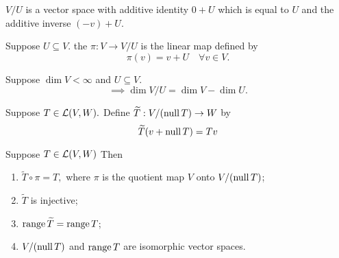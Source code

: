 \begin{thm} 
  $V/U$ is a vector space with additive identity $0+U$ which is equal to $U$ and the additive inverse $(-v)+U$.
\end{thm}

\begin{mydef} 
  Suppose $U \subseteq V$. the  $\pi: V \to V/U$ is the linear map defined by
  \begin{equation}
    \pi(v)=v+U \quad \forall v \in V.
  \end{equation}
\end{mydef}

\begin{thm}
  Suppose $\dim V < \infty$ and $U \subseteq V$.
  \begin{equation}
    \implies \dim V/U = \dim V - \dim U.
  \end{equation}
\end{thm}

\begin{mydef}
  Suppose $T \in \mathcal{L}(V,W).$ Define $\widetilde{T}: V/(\operatorname{null} T) \to W$ by
  \begin{equation}
    \widetilde{T}(v+\operatorname{null} T) = Tv
  \end{equation}
\end{mydef}

\begin{thm}
  Suppose $T\in \mathcal{L}(V,W)$ Then
  \begin{enumerate}
    \item $\widetilde{T} \circ \pi = T,$ where $\pi$ is the quotient map $V$ onto $V/(\operatorname{null} T)$;
    \item $\widetilde{T}$ is injective;
    \item $\operatorname{range} \widetilde{T} = \operatorname{range} T$;
    \item $V/(\operatorname{null} T)$ and $\operatorname{range} T$ are isomorphic vector spaces.
  \end{enumerate}
\end{thm}